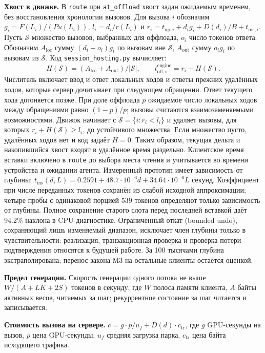 \textbf{Хвост в движке.} В \texttt{route} при \texttt{at\_offload} хвост задан ожидаемым временем,
без восстановления хронологии вызовов. Для вызова $i$ обозначим $g_i = F(L_i)/(P u(L_i))$,
$l_i=d_i/r(L_i)$ и $r_i=t_{\text{up},i}+d_i g_i+D(d_i)/B+t_{\text{ins},i}$.
Пусть $\mathcal{S}$ множество вызовов, выбранных для оффлоада, $o_i$ число токенов ответа.
Обозначим $A_{\mathrm{loc}}$ сумму $(d_i+o_i)g_i$ по вызовам вне $\mathcal{S}$,
$A_{\mathrm{out}}$ сумму $o_i g_i$ по вызовам из $\mathcal{S}$.
Код \texttt{session\_hosting.py} вычисляет:
\[
H(\mathcal{S}) = (A_{\mathrm{loc}}+A_{\mathrm{out}})/|\mathcal{S}|,\qquad
t_{\text{off},i}^{\text{engine}}=r_i+H(\mathcal{S}).
\]
Числитель включает ввод и ответ локальных ходов и ответы прежних удалённых ходов, которые сервер
дочитывает при следующем обращении. Ответ текущего хода догоняется позже. При доле оффлоада $p$ ожидаемое
число локальных ходов между обращениями равно $(1-p)/p$; вызовы считаются взаимозаменяемыми возможностями.
Движок начинает с $\mathcal{S}=\{i:r_i<l_i\}$ и удаляет вызовы, для которых $r_i+H(\mathcal{S})\geq l_i$,
до устойчивого множества. Если множество пусто, удалённых ходов нет и код задаёт $H=0$.
Таким образом, текущая дельта и накопившийся хвост входят в удалённое время раздельно.
Клиентское время вставки включено в \texttt{route} до выбора места чтения и учитывается
во времени устройства и ожидании агента. Измеренный прототип имеет зависимость от глубины:
$t_{\mathrm{ins}}(d,L)=0.2591+48.7\cdot10^{-6}d+34.64\cdot10^{-6}L$ секунд.
Коэффициент при числе переданных токенов сохранён из слабой исходной аппроксимации;
четыре пробы с одинаковой порцией 539 токенов определяют только зависимость от глубины.
Полное сохранение старого слота перед последней вставкой даёт 94.2\% наклона в CPU-диагностике.
Ограниченный откат (bounded undo), сохраняющий лишь изменяемый диапазон, исключает член глубины
только в чувствительности: реализация, транзакционная проверка и проверка потери подтверждения относятся к будущей работе.
За 100 тысячами глубина экстраполирована; перенос закона M3 на остальные клиенты остаётся оценкой.

\textbf{Предел генерации.} Скорость генерации одного потока не выше $W / (A + L K + 2S)$ токенов в секунду, где $W$
полоса памяти клиента, $A$ байты активных весов, читаемых за шаг; рекуррентное состояние за шаг читается и
записывается.

\textbf{Стоимость вызова на сервере.} $c = g \cdot p / u_f + D(d) \cdot c_{\text{tr}}$, где $g$ GPU-секунды на вызов,
$p$ цена GPU-секунды, $u_f$ средняя загрузка парка, $c_{\text{tr}}$ цена байта исходящего трафика.

